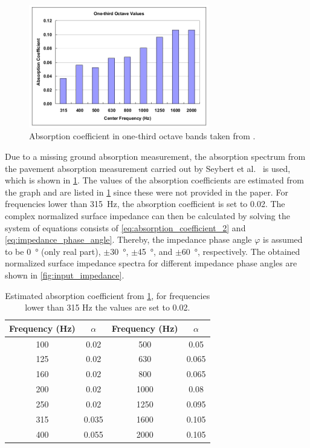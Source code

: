 {\begin{figure}[H]
	\centering
	\includegraphics[width=0.7\textwidth]{fig/chap4/impedance/absorption_spectrum.png}
	\caption{Absorption coefficient in one-third octave bands taken from \cite{Seybert2008MeasurementOP}.}
	\label{fig:ground_absorption}
\end{figure}

Due to a missing ground absorption measurement, the absorption spectrum from the pavement absorption measurement carried out by Seybert et al.\ \cite{Seybert2008MeasurementOP} is used, which is shown in \cref{fig:ground_absorption}.
The values of the absorption coefficients are estimated from the graph and are listed in \cref{tab:absorption_coefficient} since these were not provided in the paper. For frequencies lower than \SI{315}{\hertz}, the absorption coefficient is set to 0.02. The complex normalized surface impedance can then be calculated by solving the system of equations consists of \cref{eq:absorption_coefficient_2} and \cref{eq:impedance_phase_angle}. Thereby, the impedance phase angle $\varphi$ is assumed to be \SI{0}{\degree} (only real part), $\pm$\SI{30}{\degree}, $\pm$\SI{45}{\degree}, and $\pm$\SI{60}{\degree}, respectively. The obtained normalized surface impedance spectra for different impedance phase angles are shown in \cref{fig:input_impedance}.

\begin{table}[H]
	\centering
	\caption{Estimated absorption coefficient from \cref{fig:ground_absorption}, for frequencies lower than 315 Hz the values are set to 0.02.}
	\label{tab:absorption_coefficient}
	\begin{tabular}{cccc}
		\toprule
		Frequency (Hz) & $\alpha$ & Frequency (Hz) & $\alpha$ \\
		\midrule
		100 & 0.02 & 500 & 0.05 \\
		125 & 0.02 & 630 & 0.065 \\
		160 & 0.02 & 800 & 0.065 \\
		200 & 0.02 & 1000 & 0.08 \\
		250 & 0.02 & 1250 & 0.095 \\
		315 & 0.035 & 1600 & 0.105 \\
		400 & 0.055 & 2000 & 0.105 \\
		\bottomrule
	\end{tabular}
\end{table}

}
